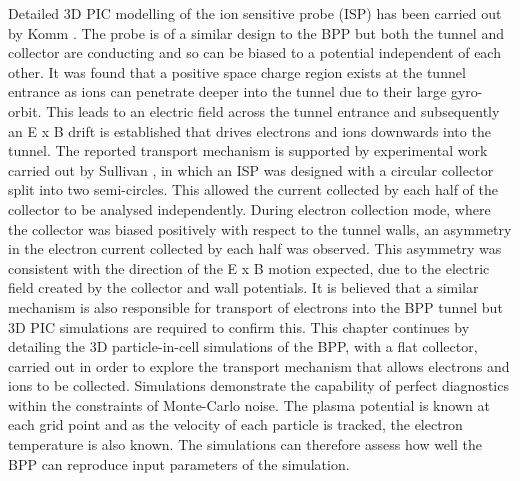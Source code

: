  Detailed 3D PIC modelling of the ion sensitive probe (ISP) has been carried out by Komm \cite{komm-ION}. The probe is of a similar design to the BPP but both the   tunnel and collector are conducting and so can be biased to a potential independent of each other. It was found that a positive space charge region exists at the tunnel entrance as ions can penetrate deeper into the tunnel due to their large gyro-orbit. This leads to an electric field across the tunnel entrance and subsequently an E x B drift is established that drives electrons and ions downwards into the tunnel. The reported transport mechanism is supported by experimental work carried out by Sullivan \cite{sullivan2013internal}, in which an ISP was designed with a circular collector split into two semi-circles. This allowed the current collected by each half of the collector to be analysed independently. During electron collection mode, where the collector was biased positively with respect to the tunnel walls, an asymmetry in the electron current collected by each half was observed. This asymmetry was consistent with the direction of the E x B motion expected, due to the electric field created by the collector and wall potentials. It is believed that a similar mechanism is also responsible for transport of electrons into the BPP tunnel but 3D PIC simulations are required to confirm this. This chapter continues by detailing the 3D particle-in-cell simulations of the BPP, with a flat collector, carried out in order to explore the transport mechanism that allows electrons and ions to be collected. Simulations demonstrate the capability of perfect diagnostics within the constraints of Monte-Carlo noise. The plasma potential is known at each grid point and as the velocity of each particle is tracked, the electron temperature is also known. The simulations can therefore assess how well the BPP can reproduce input parameters of the simulation.%



 
